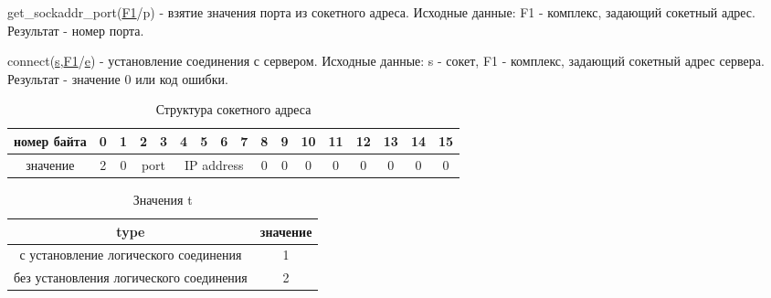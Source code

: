 \documentclass[12t,english,russian]{article}
\begin{document}
get\_sockaddr\_port(\hyperref[sockaddr]{F1}/p) - взятие значения порта из сокетного адреса. Исходные данные: F1 - комплекс, задающий сокетный адрес. Результат - номер порта.

\label{connect}
connect(\hyperref[socket]{s},\hyperref[sockaddr]{F1}/\hyperref[error]{e}) - установление соединения с сервером. Исходные данные: s - сокет, F1 - комплекс, задающий сокетный адрес сервера. Результат - значение 0 или код ошибки.

\begin{table}[H]
\caption{\label{sockaddr}Структура сокетного адреса}
\begin{center}
\begin{tabular}{|c|c|c|c|c|c|c|c|c|c|c|c|c|c|c|c|c|}
\hline
номер байта & 0 & 1 & 2 & 3 & 4 & 5 & 6 & 7 & 8 & 9 & 10 & 11 & 12 & 13 & 14 & 15 \\
\hline
значение & 2 & 0 & \multicolumn{2}{|c|}{port} & \multicolumn{4}{|c|}{IP address} & 0 & 0 & 0 & 0 & 0 & 0 & 0 & 0 \\
\hline
\end{tabular}
\end{center}
\end{table}

\begin{table}[ht]
\caption{\label{type}Значения t}
\begin{center}
\begin{tabular}{|c|c|}
\hline
type & значение \\
\hline
с установление логического соединения & 1 \\
без установления логического соединения & 2 \\
\hline
\end{tabular}
\end{center}
\end{table}
\end{document}
